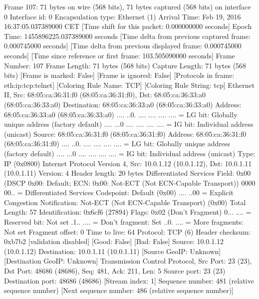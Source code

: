 Frame 107: 71 bytes on wire (568 bits), 71 bytes captured (568 bits) on interface 0
    Interface id: 0
    Encapsulation type: Ethernet (1)
    Arrival Time: Feb 19, 2016 16:37:05.037389000 CET
    [Time shift for this packet: 0.000000000 seconds]
    Epoch Time: 1455896225.037389000 seconds
    [Time delta from previous captured frame: 0.000745000 seconds]
    [Time delta from previous displayed frame: 0.000745000 seconds]
    [Time since reference or first frame: 103.505090000 seconds]
    Frame Number: 107
    Frame Length: 71 bytes (568 bits)
    Capture Length: 71 bytes (568 bits)
    [Frame is marked: False]
    [Frame is ignored: False]
    [Protocols in frame: eth:ip:tcp:telnet]
    [Coloring Rule Name: TCP]
    [Coloring Rule String: tcp]
Ethernet II, Src: 68:05:ca:36:31:f0 (68:05:ca:36:31:f0), Dst: 68:05:ca:36:33:a0 (68:05:ca:36:33:a0)
    Destination: 68:05:ca:36:33:a0 (68:05:ca:36:33:a0)
        Address: 68:05:ca:36:33:a0 (68:05:ca:36:33:a0)
        .... ..0. .... .... .... .... = LG bit: Globally unique address (factory default)
        .... ...0 .... .... .... .... = IG bit: Individual address (unicast)
    Source: 68:05:ca:36:31:f0 (68:05:ca:36:31:f0)
        Address: 68:05:ca:36:31:f0 (68:05:ca:36:31:f0)
        .... ..0. .... .... .... .... = LG bit: Globally unique address (factory default)
        .... ...0 .... .... .... .... = IG bit: Individual address (unicast)
    Type: IP (0x0800)
Internet Protocol Version 4, Src: 10.0.1.12 (10.0.1.12), Dst: 10.0.1.11 (10.0.1.11)
    Version: 4
    Header length: 20 bytes
    Differentiated Services Field: 0x00 (DSCP 0x00: Default; ECN: 0x00: Not-ECT (Not ECN-Capable Transport))
        0000 00.. = Differentiated Services Codepoint: Default (0x00)
        .... ..00 = Explicit Congestion Notification: Not-ECT (Not ECN-Capable Transport) (0x00)
    Total Length: 57
    Identification: 0x6cf6 (27894)
    Flags: 0x02 (Don't Fragment)
        0... .... = Reserved bit: Not set
        .1.. .... = Don't fragment: Set
        ..0. .... = More fragments: Not set
    Fragment offset: 0
    Time to live: 64
    Protocol: TCP (6)
    Header checksum: 0xb7b2 [validation disabled]
        [Good: False]
        [Bad: False]
    Source: 10.0.1.12 (10.0.1.12)
    Destination: 10.0.1.11 (10.0.1.11)
    [Source GeoIP: Unknown]
    [Destination GeoIP: Unknown]
Transmission Control Protocol, Src Port: 23 (23), Dst Port: 48686 (48686), Seq: 481, Ack: 211, Len: 5
    Source port: 23 (23)
    Destination port: 48686 (48686)
    [Stream index: 1]
    Sequence number: 481    (relative sequence number)
    [Next sequence number: 486    (relative sequence number)]
